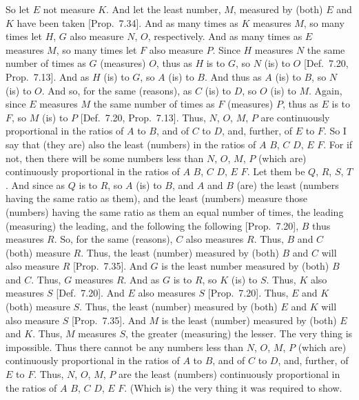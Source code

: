 \epsfysize=2.5in
\centerline{}

So let $E$ not measure $K$. And let the least number, $M$, measured by 
(both) $E$ and $K$ have been taken [Prop.~7.34]. And as
many times as $K$ measures $M$, so many times let  $H$, $G$
also measure  $N$, $O$, respectively.  And as many times as $E$ measures $M$,
so many times let $F$ also measure $P$. Since $H$ measures $N$ the same
number of times as $G$
(measures) $O$, thus as $H$ is to $G$, so
$N$ (is) to $O$ [Def.~7.20, Prop.~7.13]. And as $H$ (is) to $G$, so $A$ (is)
to $B$. And thus as $A$ (is) to $B$, so $N$ (is) to $O$. And so, for the
same (reasons),  as $C$ (is) to $D$, so $O$ (is) to $M$. Again, since
$E$ measures $M$ the same number of times as $F$ (measures) $P$,
thus as $E$ is to $F$, so $M$ (is) to $P$ [Def.~7.20, Prop.~7.13]. Thus, $N$, $O$, $M$, $P$ are continuously proportional in the ratios of $A$ to $B$, and of $C$ to $D$, and,
further, of $E$ to $F$. So I say that (they are) also the least (numbers)
in the ratios of $A$ $B$, $C$ $D$, $E$ $F$.
For if not, then there will be some numbers less than $N$, $O$, $M$, $P$
(which are) continuously proportional in the ratios of $A$ $B$, $C$ $D$,
$E$ $F$. Let them be $Q$, $R$, $S$, $T$.
And since as $Q$ is to $R$, so $A$ (is) to $B$, and $A$ and $B$ (are) the
least (numbers having the same ratio as them), and the least (numbers) measure those
(numbers) having the same ratio as them an equal number of times, the leading (measuring) the leading, and the following the following [Prop.~7.20], $B$ thus measures $R$. So, for the
same (reasons), $C$ also measures $R$.  Thus, $B$ and $C$ (both)
measure $R$. Thus, the least (number) measured by (both) $B$ and $C$ will
also measure $R$ [Prop.~7.35]. And $G$ is the
least number measured by (both) $B$ and $C$. Thus, $G$ measures $R$.
And as $G$ is to $R$, so $K$ (is) to $S$. Thus, $K$ also measures $S$
[Def.~7.20]. And $E$ also measures $S$ [Prop.~7.20]. Thus, $E$ and $K$ (both) measure
$S$. Thus, the least (number) measured by (both) $E$ and $K$ will also
measure $S$   [Prop.~7.35]. And $M$  is the least (number) measured by (both)
$E$ and $K$. Thus, $M$ measures $S$, the greater (measuring) the lesser. The very thing is impossible.
Thus there cannot be any numbers less than $N$, $O$, $M$, $P$ (which
are) continuously proportional in the ratios of $A$ to $B$, and of
$C$ to $D$, and, further, of $E$ to $F$. Thus, $N$, $O$, $M$, $P$
are the least (numbers) continuously proportional in the ratios
of $A$ $B$, $C$ $D$, $E$ $F$. (Which is) the very thing it
was required to show.

